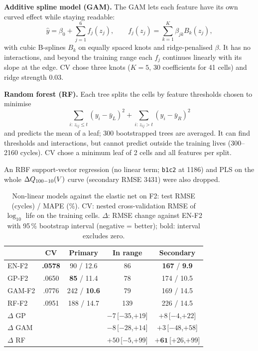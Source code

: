 \textbf{Additive spline model (GAM).} The GAM lets each feature have its own
curved effect while staying readable:
\begin{equation}
\hat y=\beta_0+\sum_{j=1}^{6}f_j(z_j),\qquad
f_j(z_j)=\sum_{k=1}^{K}\beta_{jk}B_k(z_j),
\end{equation}
with cubic B-splines $B_k$ on equally spaced knots and ridge-penalised
$\beta$. It has no interactions, and beyond the training range each $f_j$
continues linearly with its slope at the edge. CV chose three knots ($K=5$,
30 coefficients for 41 cells) and ridge strength 0.03.

\textbf{Random forest (RF).} Each tree splits the cells by feature thresholds
chosen to minimise
\begin{equation}
\sum_{i:\,z_{ij}\le t}(y_i-\bar y_L)^2+\sum_{i:\,z_{ij}>t}(y_i-\bar y_R)^2
\end{equation}
and predicts the mean of a leaf; 300 bootstrapped trees are averaged. It can
find thresholds and interactions, but cannot predict outside the training
lives (300--2160 cycles). CV chose a minimum leaf of 2 cells and all features
per split.

An RBF support-vector regression (no linear term; \texttt{b1c2} at 1186) and
PLS on the whole $\Delta Q_{100-10}(V)$ curve (secondary RMSE 3431) were also dropped.

\begin{table}[!htb]
\centering
\caption{Non-linear models against the elastic net on F2: test RMSE
(cycles) / MAPE (\%). CV: nested cross-validation RMSE of $\log_{10}$ life
on the training cells. $\Delta$: RMSE change against EN-F2 with 95\,\%
bootstrap interval (negative = better); bold: interval excludes zero.}
\label{tab:rq2}
\footnotesize
\setlength{\tabcolsep}{2.6pt}
\begin{tabular}{@{}lcccc@{}}
\toprule
 & CV & Primary & In range & Secondary \\
\midrule
EN-F2  & \textbf{.0578} & 90 / 12.6 & 86 & \textbf{167} / \textbf{9.9} \\
GP-F2  & .0650 & \textbf{85} / 11.4 & 78 & 174 / 10.5 \\
GAM-F2 & .0776 & 242 / \textbf{10.6} & 79 & 169 / 14.5 \\
RF-F2  & .0951 & 188 / 14.7 & 139 & 226 / 14.5 \\
\midrule
$\Delta$ GP  & & & $-7$\,[$-35$,$+19$] & $+8$\,[$-4$,$+22$] \\
$\Delta$ GAM & & & $-8$\,[$-28$,$+14$] & $+3$\,[$-48$,$+58$] \\
$\Delta$ RF  & & & $+50$\,[$-5$,$+99$] & $\mathbf{+61}$\,[$+26$,$+99$] \\
\bottomrule
\end{tabular}
\end{table}

